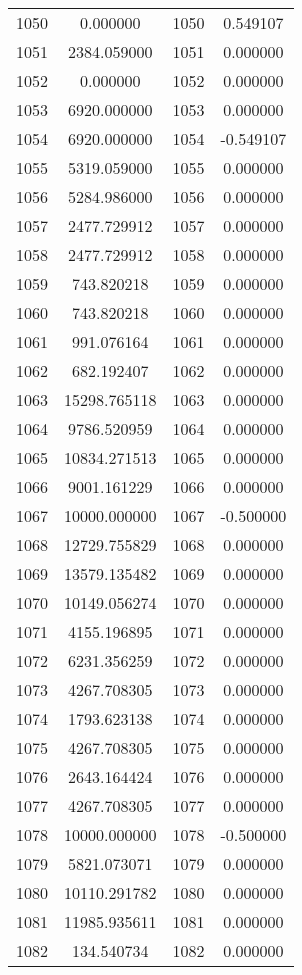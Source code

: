 \documentclass[12pt]{article}
\begin{document}
\begin{longtable}{@{}cccc@{}}
1050 & 0.000000 & 1050 & 0.549107 \\
1051 & 2384.059000 & 1051 & 0.000000 \\
1052 & 0.000000 & 1052 & 0.000000 \\
1053 & 6920.000000 & 1053 & 0.000000 \\
1054 & 6920.000000 & 1054 & -0.549107 \\
1055 & 5319.059000 & 1055 & 0.000000 \\
1056 & 5284.986000 & 1056 & 0.000000 \\
1057 & 2477.729912 & 1057 & 0.000000 \\
1058 & 2477.729912 & 1058 & 0.000000 \\
1059 & 743.820218 & 1059 & 0.000000 \\
1060 & 743.820218 & 1060 & 0.000000 \\
1061 & 991.076164 & 1061 & 0.000000 \\
1062 & 682.192407 & 1062 & 0.000000 \\
1063 & 15298.765118 & 1063 & 0.000000 \\
1064 & 9786.520959 & 1064 & 0.000000 \\
1065 & 10834.271513 & 1065 & 0.000000 \\
1066 & 9001.161229 & 1066 & 0.000000 \\
1067 & 10000.000000 & 1067 & -0.500000 \\
1068 & 12729.755829 & 1068 & 0.000000 \\
1069 & 13579.135482 & 1069 & 0.000000 \\
1070 & 10149.056274 & 1070 & 0.000000 \\
1071 & 4155.196895 & 1071 & 0.000000 \\
1072 & 6231.356259 & 1072 & 0.000000 \\
1073 & 4267.708305 & 1073 & 0.000000 \\
1074 & 1793.623138 & 1074 & 0.000000 \\
1075 & 4267.708305 & 1075 & 0.000000 \\
1076 & 2643.164424 & 1076 & 0.000000 \\
1077 & 4267.708305 & 1077 & 0.000000 \\
1078 & 10000.000000 & 1078 & -0.500000 \\
1079 & 5821.073071 & 1079 & 0.000000 \\
1080 & 10110.291782 & 1080 & 0.000000 \\
1081 & 11985.935611 & 1081 & 0.000000 \\
1082 & 134.540734 & 1082 & 0.000000 \\

\end{longtable}
\end{document}
